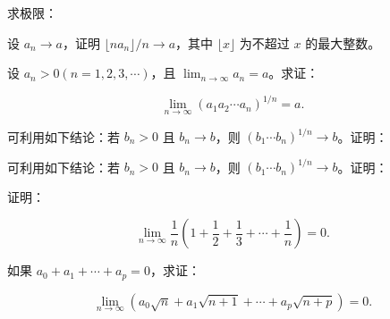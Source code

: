 \noindent\begin{minipage}{\textwidth}
求极限：
\end{minipage}\par\vfill
\noindent\begin{minipage}{\textwidth}
设 $a_n\to a$，证明 $\lfloor na_n\rfloor/n\to a$，其中 $\lfloor x\rfloor$ 为不超过 $x$ 的最大整数。
\end{minipage}\par\vfill
\newpage
\noindent\begin{minipage}{\textwidth}
设  $ a_{n}>0(n=1,2,3,\cdots) $，且  $ \lim_{n\to\infty}a_n=a $。求证：

\[\lim_{n\to\infty}(a_{1}a_{2}\cdots a_{n})^{1/n}=a.\]
\end{minipage}\par\vfill
\noindent\begin{minipage}{\textwidth}
可利用如下结论：若 $b_n>0$ 且 $b_n\to b$，则 $(b_1\cdots b_n)^{1/n}\to b$。证明：
\end{minipage}\par\vfill
\noindent\begin{minipage}{\textwidth}
可利用如下结论：若 $b_n>0$ 且 $b_n\to b$，则 $(b_1\cdots b_n)^{1/n}\to b$。证明：
\end{minipage}\par\vfill
\newpage
\noindent\begin{minipage}{\textwidth}
证明：

\[\lim_{n\to\infty}\frac{1}{n}\left(1+\frac{1}{2}+\frac{1}{3}+\cdots+\frac{1}{n}\right)=0.\]
\end{minipage}\par\vfill
\noindent\begin{minipage}{\textwidth}
如果  $ a_{0} + a_{1} + \cdots + a_{p} = 0 $，求证：

\[\lim_{n\to\infty}(a_{0}\sqrt{n}+a_{1}\sqrt{n+1}+\cdots+a_{p}\sqrt{n+p})=0.\]
\end{minipage}\par\vfill
